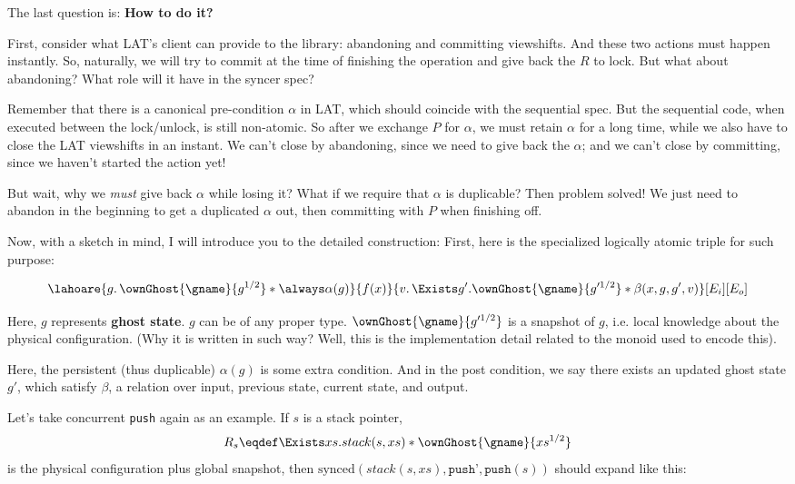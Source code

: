 \documentclass[11pt]{article}
\begin{document}
The last question is: \textbf{How to do it?}

First, consider what LAT's client can provide to the library: abandoning and committing viewshifts. And these two actions must happen instantly. So, naturally, we will try to commit at the time of finishing the operation and give back the $R$ to lock. But what about abandoning? What role will it have in the syncer spec?

Remember that there is a canonical pre-condition $\alpha$ in LAT, which should coincide with the sequential spec. But the sequential code, when executed between the lock/unlock, is still non-atomic. So after we exchange $P$ for $\alpha$, we must retain $\alpha$ for a long time, while we also have to close the LAT viewshifts in an instant. We can't close by abandoning, since we need to give back the $\alpha$; and we can't close by committing, since we haven't started the action yet!

But wait, why we \emph{must} give back $\alpha$ while losing it? What if we require that $\alpha$ is duplicable? Then problem solved! We just need to abandon in the beginning to get a duplicated $\alpha$ out, then committing with $P$ when finishing off.

Now, with a sketch in mind, I will introduce you to the detailed construction: First, here is the specialized logically atomic triple for such purpose:

\[ \lahoare{g.\, \ownGhost{\gname}{g^{1/2}} * \always \alpha(g)}
           {f(x)}
           {v.\, \Exists g'. \ownGhost{\gname}{g'^{1/2}} * \beta(x, g, g', v)}[E_i][E_o]\]

Here, $g$ represents \textbf{ghost state}. $g$ can be of any proper type. $\ownGhost{\gname}{g'^{1/2}}$ is a snapshot of $g$, i.e. local knowledge about the physical configuration. (Why it is written in such way? Well, this is the implementation detail related to the monoid used to encode this).

Here, the persistent (thus duplicable) $\alpha(g)$ is some extra condition. And in the post condition, we say there exists an updated ghost state $g'$, which satisfy $\beta$, a relation over input, previous state, current state, and output.

Let's take concurrent \texttt{push} again as an example. If $s$ is a stack pointer, \[R_s \eqdef \Exists xs. stack(s, xs) * \ownGhost{\gname}{xs^{1/2}}\] is the physical configuration plus global snapshot, then $\text{synced}(stack(s, xs), \texttt{push'}, \texttt{push}(s))$ should expand like this:
\end{document}
